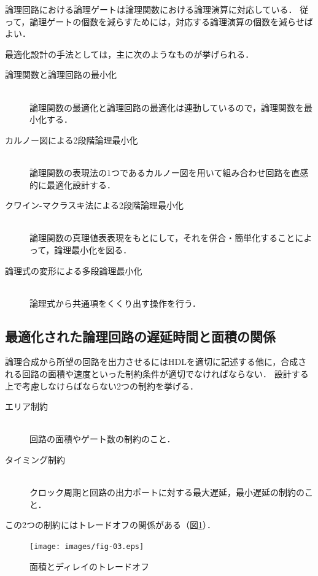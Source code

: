 \documentclass[uplatex]{jsarticle}
\begin{document}
論理回路における論理ゲートは論理関数における論理演算に対応している．
従って，論理ゲートの個数を減らすためには，対応する論理演算の個数を減らせばよい．

最適化設計の手法としては，主に次のようなものが挙げられる．

\begin{description}
 \item[論理関数と論理回路の最小化]\mbox{}\\ 
  論理関数の最適化と論理回路の最適化は連動しているので，論理関数を最小化する．
 \item[カルノー図による2段階論理最小化]\mbox{}\\
  論理関数の表現法の1つであるカルノー図を用いて組み合わせ回路を直感的に最適化設計する．
 \item[クワイン-マクラスキ法による2段階論理最小化]\mbox{}\\
  論理関数の真理値表表現をもとにして，それを併合・簡単化することによって，論理最小化を図る．
 \item[論理式の変形による多段論理最小化]\mbox{}\\
  論理式から共通項をくくり出す操作を行う．
\end{description}

\subsection{最適化された論理回路の遅延時間と面積の関係}

論理合成から所望の回路を出力させるにはHDLを適切に記述する他に，合成される回路の面積や速度といった制約条件が適切でなければならない．
設計する上で考慮しなけらばならない2つの制約を挙げる．

\begin{description}
 \item[エリア制約]\mbox{}\\ 
   回路の面積やゲート数の制約のこと．
 \item[タイミング制約]\mbox{}\\
  クロック周期と回路の出力ポートに対する最大遅延，最小遅延の制約のこと．
\end{description}

この2つの制約にはトレードオフの関係がある（図\ref{fig:03}）．

\begin{figure}[htb]
  \begin{center}
    \texttt{[image: images/fig-03.eps]}
    \caption{面積とディレイのトレードオフ}
    \label{fig:03}
  \end{center}
\end{figure}
\end{document}
